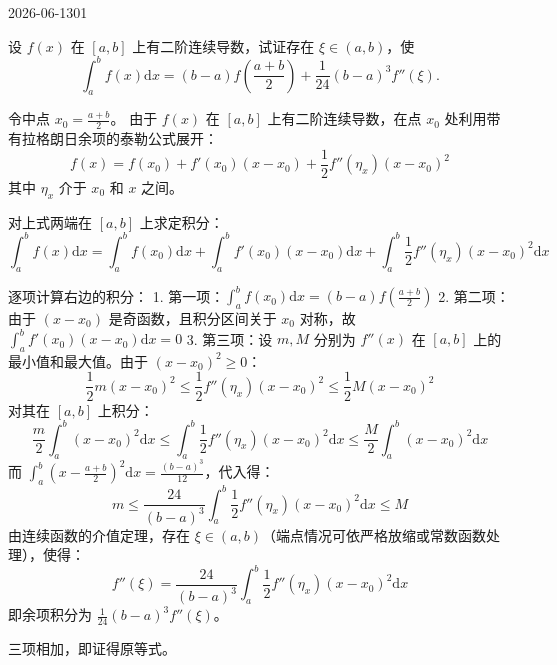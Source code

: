 \begin{mistake}{2026-06-13}{01}

\begin{problemcontent}
设 \(f(x)\) 在 \([a,b]\) 上有二阶连续导数，试证存在 \(\xi \in (a,b)\)，使
\[ \int_a^b f(x) \mathrm{d}x = (b-a) f\left(\frac{a+b}{2}\right) + \frac{1}{24} (b-a)^3 f''(\xi). \]
\end{problemcontent}

\begin{solutioncontent}
令中点 \(x_0 = \frac{a+b}{2}\)。
由于 \(f(x)\) 在 \([a,b]\) 上有二阶连续导数，在点 \(x_0\) 处利用带有拉格朗日余项的泰勒公式展开：
\[ f(x) = f(x_0) + f'(x_0)(x-x_0) + \frac{1}{2} f''(\eta_x)(x-x_0)^2 \]
其中 \(\eta_x\) 介于 \(x_0\) 和 \(x\) 之间。

对上式两端在 \([a,b]\) 上求定积分：
\[ \int_a^b f(x) \mathrm{d}x = \int_a^b f(x_0) \mathrm{d}x + \int_a^b f'(x_0)(x-x_0) \mathrm{d}x + \int_a^b \frac{1}{2} f''(\eta_x)(x-x_0)^2 \mathrm{d}x \]

逐项计算右边的积分：
1. 第一项：\(\int_a^b f(x_0) \mathrm{d}x = (b-a) f\left(\frac{a+b}{2}\right)\)
2. 第二项：由于 \((x-x_0)\) 是奇函数，且积分区间关于 \(x_0\) 对称，故 \(\int_a^b f'(x_0)(x-x_0) \mathrm{d}x = 0\)
3. 第三项：设 \(m, M\) 分别为 \(f''(x)\) 在 \([a,b]\) 上的最小值和最大值。由于 \((x-x_0)^2 \ge 0\)：
   \[ \frac{1}{2} m (x-x_0)^2 \le \frac{1}{2} f''(\eta_x)(x-x_0)^2 \le \frac{1}{2} M (x-x_0)^2 \]
   对其在 \([a,b]\) 上积分：
   \[ \frac{m}{2} \int_a^b (x-x_0)^2 \mathrm{d}x \le \int_a^b \frac{1}{2} f''(\eta_x)(x-x_0)^2 \mathrm{d}x \le \frac{M}{2} \int_a^b (x-x_0)^2 \mathrm{d}x \]
   而 \(\int_a^b \left(x - \frac{a+b}{2}\right)^2 \mathrm{d}x = \frac{(b-a)^3}{12}\)，代入得：
   \[ m \le \frac{24}{(b-a)^3} \int_a^b \frac{1}{2} f''(\eta_x)(x-x_0)^2 \mathrm{d}x \le M \]
   由连续函数的介值定理，存在 \(\xi \in (a,b)\)（端点情况可依严格放缩或常数函数处理），使得：
   \[ f''(\xi) = \frac{24}{(b-a)^3} \int_a^b \frac{1}{2} f''(\eta_x)(x-x_0)^2 \mathrm{d}x \]
   即余项积分为 \(\frac{1}{24}(b-a)^3 f''(\xi)\)。

三项相加，即证得原等式。
\end{solutioncontent}


\end{mistake}
